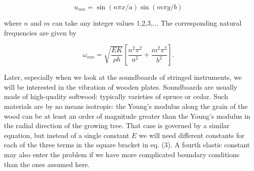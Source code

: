   $$u_{nm}=\sin(n \pi x/a) \sin(m \pi y/b) \tag{5}$$ 

  where $n$ and $m$ can take any integer values 1,2,3,... The corresponding 
  natural frequencies are given by 

  $$\omega_{nm} = \sqrt{\frac{EK}{\rho h}} \left[\frac{n^2 
  \pi^2}{a^2}+\frac{m^2 \pi^2}{b^2} \right] .\tag{6}$$ 

  Later, especially when we look at the soundboards of stringed instruments, we 
  will be interested in the vibration of wooden plates. Soundboards are usually 
  made of high-quality softwood: typically varieties of spruce or cedar. Such 
  materials are by no means isotropic: the Young's modulus along the grain of 
  the wood can be at least an order of magnitude greater than the Young's 
  modulus in the radial direction of the growing tree. That case is governed by 
  a similar equation, but instead of a single constant $E$ we will need 
  different constants for each of the three terms in the square bracket in eq. 
  (3). A fourth elastic constant may also enter the problem if we have more 
  complicated boundary conditions than the ones assumed here. 